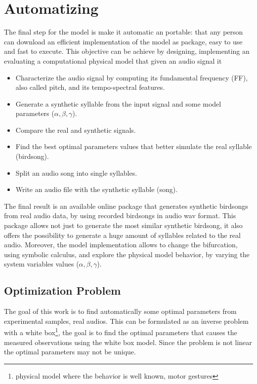 \section{Automatizing}

The final step for the model is make it automatic an portable: that any person can download an efficient implementation of the model as package, easy to use and fast to execute. This objective can be achieve by designing, implementing an evaluating a computational physical model that given an audio signal it 

\begin{itemize}
    \item Characterize the audio signal by computing its fundamental frequency (FF), also called pitch, and its tempo-spectral features.
    \item Generate a synthetic syllable from the input signal and some model parameters ($\alpha, \beta, \gamma$).
    \item Compare the real and synthetic signals.
    \item Find the best optimal parameters values that better simulate the real syllable (birdsong).
    \item Split an audio song into single syllables.
    \item Write an audio file with the synthetic syllable (song).
\end{itemize}

The final result is an available online package that generates synthetic birdsongs from real audio data, by using recorded birdsongs in audio wav format. This package allows not just to generate the most similar synthetic birdsong, it also offers the possibility to generate a huge amount of syllables related to the real audio. Moreover, the model implementation allows to change the bifurcation, using symbolic calculus, and explore the physical model behavior, by varying the system variables values ($\alpha, \beta, \gamma$).

\subsection{Optimization Problem}

The goal of this work is to find automatically some optimal parameters from experimental samples, real audios. This can be formulated as an inverse problem with a white box\footnote{physical model where the behavior is well known, motor gestures}, the goal is to find the optimal parameters that causes the measured observations using the white box model. Since the problem is not linear the optimal parameters may not be unique. \\

